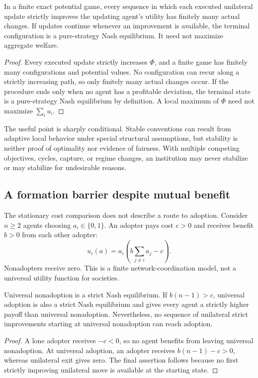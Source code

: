 \begin{MSproposition}\label{MS:prop:potential}
In a finite exact potential game, every sequence in which each executed unilateral update strictly improves the updating agent's utility has finitely many actual changes. If updates continue whenever an improvement is available, the terminal configuration is a pure-strategy Nash equilibrium. It need not maximize aggregate welfare.
\end{MSproposition}
\begin{proof}
Every executed update strictly increases $\Phi$, and a finite game has finitely many configurations and potential values. No configuration can recur along a strictly increasing path, so only finitely many actual changes occur. If the procedure ends only when no agent has a profitable deviation, the terminal state is a pure-strategy Nash equilibrium by definition. A local maximum of $\Phi$ need not maximize $\sum_i u_i$.
\end{proof}

The useful point is sharply conditional. Stable conventions can result from adaptive local behavior under special structural assumptions, but stability is neither proof of optimality nor evidence of fairness. With multiple competing objectives, cycles, capture, or regime changes, an institution may never stabilize or may stabilize for undesirable reasons.


\subsection{A formation barrier despite mutual benefit}
The stationary cost comparison does not describe a route to adoption. Consider $n\geq2$ agents choosing $a_i\in\{0,1\}$. An adopter pays cost $c>0$ and receives benefit $b>0$ from each other adopter:
\[
u_i(a)=a_i\left(b\sum_{j\ne i}a_j-c\right).
\]
Nonadopters receive zero. This is a finite network-coordination model, not a universal utility function for societies.

\begin{MSproposition}\label{MS:prop:barrier}
Universal nonadoption is a strict Nash equilibrium. If $b(n-1)>c$, universal adoption is also a strict Nash equilibrium and gives every agent a strictly higher payoff than universal nonadoption. Nevertheless, no sequence of unilateral strict improvements starting at universal nonadoption can reach adoption.
\end{MSproposition}
\begin{proof}
A lone adopter receives $-c<0$, so no agent benefits from leaving universal nonadoption. At universal adoption, an adopter receives $b(n-1)-c>0$, whereas unilateral exit gives zero. The final assertion follows because no first strictly improving unilateral move is available at the starting state.
\end{proof}

